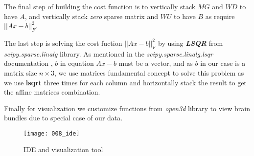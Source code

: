 \documentclass[../structure.tex]{subfiles}
\begin{document}
The final step of building the cost function is to vertically stack $MG$ and $WD$ to have $A$, and vertically stack \textit{zero} sparse matrix and $WU$ to have $B$ as require $||Ax-b||_{F}^2$.

The last step is solving the cost fuction $||Ax-b||_{F}^2$ by using \textbf{\textit{LSQR}} from \textit{scipy.sparse.linalg} library. As mentioned in the \textit{scipy.sparse.linalg.lsqr} documentation \cite{Jones2001}, $b$ in equation $Ax-b$ must be a vector, and as $b$ in our case is a matrix size $n\times 3$, we use matrices fundamental concept to solve this problem as we use \textbf{lsqrt} three times for each column and horizontally stack the result to get the affine matrices combination.

Finally for visualization we customize functions from \textit{open3d} library to view brain bundles due to special case of our data.


\begin{figure}[h!]
\centering
\texttt{[image: 008\_ide]}
\captionsetup{justification=centering}
\caption{IDE and visualization tool}
\end{figure}
\end{document}
